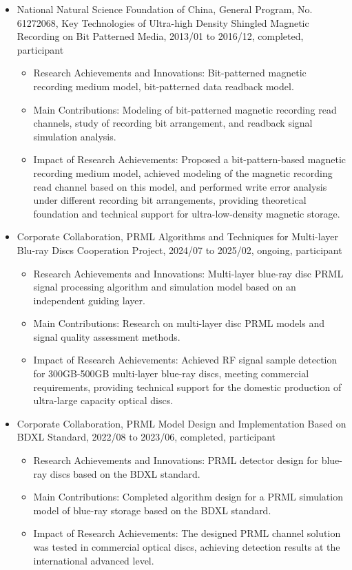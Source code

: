 \documentclass[en]{resume}
\begin{document}
\begin{itemize}
  \item National Natural Science Foundation of China, General Program, No. 61272068, Key Technologies of Ultra-high Density Shingled Magnetic Recording on Bit Patterned Media, 2013/01 to 2016/12, completed, participant
  \begin{itemize}
    \item Research Achievements and Innovations: Bit-patterned magnetic recording medium model, bit-patterned data readback model.
    \item Main Contributions: Modeling of bit-patterned magnetic recording read channels, study of recording bit arrangement, and readback signal simulation analysis.
    \item Impact of Research Achievements: Proposed a bit-pattern-based magnetic recording medium model, achieved modeling of the magnetic recording read channel based on this model, and performed write error analysis under different recording bit arrangements, providing theoretical foundation and technical support for ultra-low-density magnetic storage.
  \end{itemize}
  
  \item Corporate Collaboration, PRML Algorithms and Techniques for Multi-layer Blu-ray Discs Cooperation Project, 2024/07 to 2025/02, ongoing, participant
  \begin{itemize}
    \item Research Achievements and Innovations: Multi-layer blue-ray disc PRML signal processing algorithm and simulation model based on an independent guiding layer.
    \item Main Contributions: Research on multi-layer disc PRML models and signal quality assessment methods.
    \item Impact of Research Achievements: Achieved RF signal sample detection for 300GB-500GB multi-layer blue-ray discs, meeting commercial requirements, providing technical support for the domestic production of ultra-large capacity optical discs.
  \end{itemize}

  \item Corporate Collaboration, PRML Model Design and Implementation Based on BDXL Standard, 2022/08 to 2023/06, completed, participant
  \begin{itemize}
    \item Research Achievements and Innovations: PRML detector design for blue-ray discs based on the BDXL standard.
    \item Main Contributions: Completed algorithm design for a PRML simulation model of blue-ray storage based on the BDXL standard.
    \item Impact of Research Achievements: The designed PRML channel solution was tested in commercial optical discs, achieving detection results at the international advanced level.
  \end{itemize}


\end{itemize}
\end{document}
